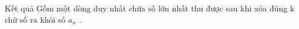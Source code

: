 Kết quả
Gồm một dòng duy nhất chứa số lớn nhất thu được sau khi xóa đúng k chữ số ra khỏi số $a_{n}$ .